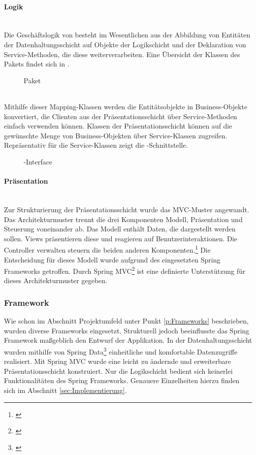 \paragraph{Logik} ~\\\label{p:Logik}
Die Geschäftslogik von \projektName besteht im Wesentlichen aus der Abbildung von Entitäten der Datenhaltungsschicht auf Objekte der Logikschicht und der Deklaration von Service-Methoden, die diese weiterverarbeiten. Eine Übersicht der Klassen des Pakets  findet sich in .
\begin{figure}[htb]
	\centering
	\caption{Paket }
	\label{fig:Mapping}
\end{figure}\\
Mithilfe dieser Mapping-Klassen werden die Entitätsobjekte in Business-Objekte konvertiert, die Clienten aus der Präsentationsschicht über Service-Methoden einfach verwenden können. Klassen der Präsentationsschicht können auf die gewünschte Menge von Business-Objekten über Service-Klassen zugreifen. Repräsentativ für die Service-Klassen zeigt  die -Schnittstelle.
\begin{figure}[htb]
	\centering
	\caption{-Interface}
	\label{fig:Logik}
\end{figure}

\paragraph{Präsentation} ~\\\label{p:Praesentation}
Zur Strukturierung der Präsentationsschicht wurde das \ac{MVC}-Muster angewandt. Das Architekturmuster trennt die drei Komponenten Modell, Präsentation und Steuerung voneinander ab. Das Modell enthält Daten, die dargestellt werden sollen. Views präsentieren diese und reagieren auf Benutzerinteraktionen. Die Controller verwalten \bzw steuern die beiden anderen Komponenten.\footnote{\Vgl \cite{wiki:mvc}}
Die Entscheidung für dieses Modell wurde aufgrund des eingesetzten Spring Frameworks getroffen. Durch Spring MVC\footnote{\Vgl \cite{spring:mvc}} ist eine definierte Unterstützung für dieses Architekturmuster gegeben.

\subsubsection{Framework}\label{sec:Framework}
Wie schon im Abschnitt Projektumfeld unter Punkt \ref{p:Frameworks} beschrieben, wurden diverse Frameworks eingesetzt. Strukturell jedoch beeinflusste das Spring Framework maßgeblich den Entwurf der Applikation. In der Datenhaltungsschicht wurden mithilfe von Spring Data\footnote{\Vgl \cite{spring:data}} einheitliche und komfortable Datenzugriffe realisiert. Mit Spring MVC wurde eine leicht zu ändernde und erweiterbare Präsentationsschicht konstruiert. Nur die Logikschicht bedient sich keinerlei Funktionalitäten des Spring Frameworks. Genauere Einzelheiten hierzu finden sich im Abschnitt \ref{sec:Implementierung}.

